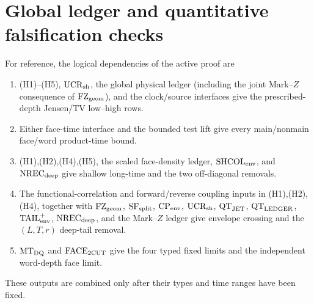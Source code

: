 \documentclass[11pt]{article}
\begin{document}
\section{Global ledger and quantitative falsification checks}

For reference, the logical dependencies of the active proof are
\begin{enumerate}[label=\textup{(D\arabic*)}]
\item \textup{(H1)--(H5)}, $\mathrm{UCR}_{\rm sh}$, the global physical
      ledger (including the joint Mark--$Z$ consequence of
      $\mathrm{FZ}_{\rm geom}$), and the clock/source interfaces give the
      prescribed-depth Jensen/TV low--high rows.
\item Either face-time interface and the bounded test lift give every
      main/nonmain face/word product-time bound.
\item \textup{(H1),(H2),(H4),(H5)}, the scaled face-density ledger,
      $\mathrm{SHCOL}_{\rm env}$, and $\mathrm{NREC}_{\rm deep}$ give
      shallow long-time and the two off-diagonal removals.
\item The functional-correlation and forward/reverse coupling inputs in
      \textup{(H1),(H2),(H4)}, together with
      $\mathrm{FZ}_{\rm geom}$, $\mathrm{SF}_{\rm split}$,
      $\mathrm{CP}_{\rm env}$, $\mathrm{UCR}_{\rm sh}$,
      $\mathrm{QT}_{\rm JET}$, $\mathrm{QT}_{\rm LEDGER}$,
      $\mathrm{TAIL}_{\rm env}^{+}$, $\mathrm{NREC}_{\rm deep}$, and the
      Mark--$Z$ ledger give envelope crossing and the $(L,T,r)$ deep-tail
      removal.
\item $\mathrm{MT}_{\rm DQ}$ and $\mathrm{FACE}_{\rm 2CUT}$ give the four
      typed fixed limits and the independent word-depth face limit.
\end{enumerate}
These outputs are combined only after their types and time ranges have been
fixed.
\end{document}
